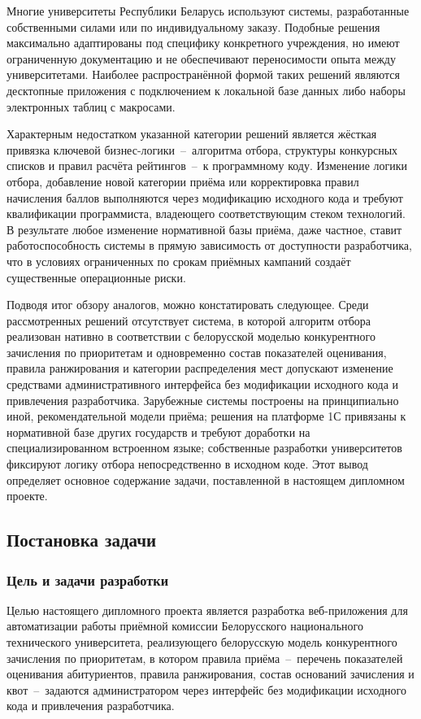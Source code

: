 Многие университеты Республики Беларусь используют системы, разработанные собственными силами или по индивидуальному заказу.
Подобные решения максимально адаптированы под специфику конкретного учреждения, но имеют ограниченную документацию и не обеспечивают переносимости опыта между университетами.
Наиболее распространённой формой таких решений являются десктопные приложения с подключением к локальной базе данных либо наборы электронных таблиц с макросами.

Характерным недостатком указанной категории решений является жёсткая привязка ключевой бизнес-логики~--~алгоритма отбора, структуры конкурсных списков и правил расчёта рейтингов~--~к программному коду.
Изменение логики отбора, добавление новой категории приёма или корректировка правил начисления баллов выполняются через модификацию исходного кода и требуют квалификации программиста, владеющего соответствующим стеком технологий.
В результате любое изменение нормативной базы приёма, даже частное, ставит работоспособность системы в прямую зависимость от доступности разработчика, что в условиях ограниченных по срокам приёмных кампаний создаёт существенные операционные риски.

Подводя итог обзору аналогов, можно констатировать следующее.
Среди рассмотренных решений отсутствует система, в которой алгоритм отбора реализован нативно в соответствии с белорусской моделью конкурентного зачисления по приоритетам и одновременно состав показателей оценивания, правила ранжирования и категории распределения мест допускают изменение средствами административного интерфейса без модификации исходного кода и привлечения разработчика.
Зарубежные системы построены на принципиально иной, рекомендательной модели приёма; решения на платформе 1С привязаны к нормативной базе других государств и требуют доработки на специализированном встроенном языке; собственные разработки университетов фиксируют логику отбора непосредственно в исходном коде.
Этот вывод определяет основное содержание задачи, поставленной в настоящем дипломном проекте.

\subsection{Постановка задачи}

\subsubsection{Цель и задачи разработки}

Целью настоящего дипломного проекта является разработка веб-приложения для автоматизации работы приёмной комиссии Белорусского национального технического университета, реализующего белорусскую модель конкурентного зачисления по приоритетам, в котором правила приёма~--~перечень показателей оценивания абитуриентов, правила ранжирования, состав оснований зачисления и квот~--~задаются администратором через интерфейс без модификации исходного кода и привлечения разработчика.

